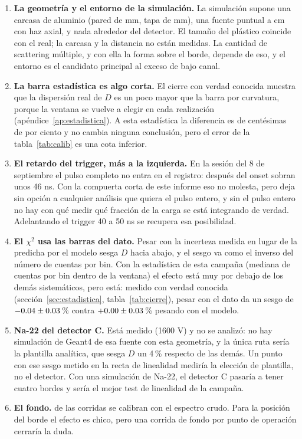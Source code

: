\documentclass[11pt,a4paper]{article}
\begin{document}
\begin{enumerate}
\item \textbf{La geometría y el entorno de la simulación.} La simulación
      supone una carcasa de aluminio (pared de \SimPared{} mm, tapa de
      \SimTapa{} mm), una fuente puntual a \SimDistancia{} cm con haz axial,
      y nada alrededor del detector. El tamaño del plástico coincide con el
      real; la carcasa y la distancia no están medidas. La cantidad de
      scattering múltiple, y con ella la forma sobre el borde, depende de
      eso, y el entorno es el candidato principal al exceso de bajo canal.
\item \textbf{La barra estadística es algo corta.} El cierre con verdad
      conocida muestra que la dispersión real de $D$ es un poco mayor que la
      barra por curvatura, porque la ventana se vuelve a elegir en cada
      realización (apéndice~\ref{ap:estadistica}). A esta estadística la
      diferencia es de centésimas de por ciento y no cambia ninguna
      conclusión, pero el error de la tabla~\ref{tab:calib} es una cota
      inferior.
\item \textbf{El retardo del trigger, más a la izquierda.} En la sesión del 8
      de septiembre el pulso completo no entra en el registro: después del
      onset sobran unos 46 ns. Con la compuerta corta de este informe eso no
      molesta, pero deja sin opción a cualquier análisis que quiera el pulso
      entero, y sin el pulso entero no hay con qué medir qué fracción de la
      carga se está integrando de verdad. Adelantando el trigger 40 a 50 ns se
      recupera esa posibilidad.

\item \textbf{El $\chi^2$ usa las barras del dato.} Pesar con la incerteza
      medida en lugar de la predicha por el modelo sesga $D$ hacia abajo, y el
      sesgo va como el inverso del número de cuentas por bin. Con la
      estadística de esta campaña (mediana de \CuentasBin{} cuentas por bin
      dentro de la ventana) el efecto está muy por debajo de los demás
      sistemáticos, pero está: medido con verdad conocida
      (sección~\ref{sec:estadistica}, tabla~\ref{tab:cierre}), pesar con el
      dato da un sesgo de $-0.04 \pm 0.03$\,\%
      contra $+0.00 \pm 0.03$\,\% pesando
      con el modelo.

\item \textbf{Na-22 del detector C.} Está medido (1600 V) y no se analizó: no
      hay simulación de Geant4 de esa fuente con esta geometría, y la única
      ruta sería la plantilla analítica, que sesga $D$ un 4\,\% respecto de las
      demás. Un punto con ese sesgo metido en la recta de linealidad mediría la
      elección de plantilla, no el detector. Con una simulación de Na-22, el
      detector C pasaría a tener cuatro bordes y sería el mejor test de
      linealidad de la campaña.

\item \textbf{El fondo.} \NSinFondo{} de las \NCorridas{} corridas se calibran
      con el espectro crudo. Para la posición del borde el efecto es chico,
      pero una corrida de fondo por punto de operación cerraría la duda.
\end{enumerate}
\end{document}
